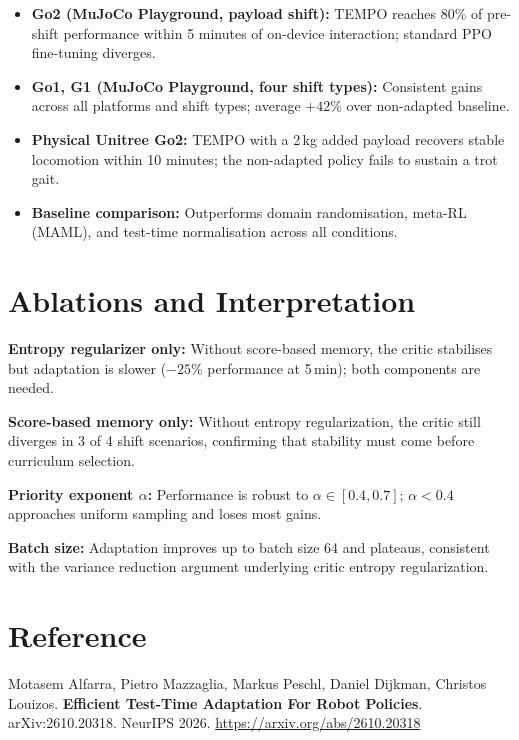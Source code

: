 \documentclass[10pt,twocolumn]{article}
\begin{document}
\begin{itemize}[itemsep=2pt,parsep=0pt]
  \item \textbf{Go2 (MuJoCo Playground, payload shift):} TEMPO reaches
    80\% of pre-shift performance within 5 minutes of on-device
    interaction; standard PPO fine-tuning diverges.
  \item \textbf{Go1, G1 (MuJoCo Playground, four shift types):}
    Consistent gains across all platforms and shift types; average
    $+42\%$ over non-adapted baseline.
  \item \textbf{Physical Unitree Go2:} TEMPO with a 2\,kg added
    payload recovers stable locomotion within 10 minutes; the
    non-adapted policy fails to sustain a trot gait.
  \item \textbf{Baseline comparison:} Outperforms domain randomisation,
    meta-RL (MAML), and test-time normalisation across all conditions.
\end{itemize}

\section{Ablations and Interpretation}

\textbf{Entropy regularizer only:}
Without score-based memory, the critic stabilises but adaptation is
slower ($-25\%$ performance at 5\,min); both components are needed.

\textbf{Score-based memory only:}
Without entropy regularization, the critic still diverges in 3 of 4
shift scenarios, confirming that stability must come before
curriculum selection.

\textbf{Priority exponent $\alpha$:}
Performance is robust to $\alpha \in [0.4, 0.7]$; $\alpha < 0.4$
approaches uniform sampling and loses most gains.

\textbf{Batch size:}
Adaptation improves up to batch size 64 and plateaus, consistent
with the variance reduction argument underlying critic entropy
regularization.

\section*{Reference}

Motasem Alfarra, Pietro Mazzaglia, Markus Peschl, Daniel Dijkman,
Christos Louizos.
\textbf{Efficient Test-Time Adaptation For Robot Policies}.
arXiv:2610.20318. NeurIPS 2026.
\url{https://arxiv.org/abs/2610.20318}
\end{document}
